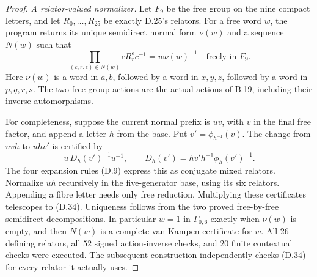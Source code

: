 \begin{proof}
\emph{A relator-valued normalizer.}
Let $F_9$ be the free group on the nine compact letters,
and let $R_0,\ldots,R_{25}$ be exactly D.25's relators.
For a free word $w$, the program
 returns its unique semidirect
normal form $\nu(w)$ and a sequence $N(w)$ such that
\[
     \prod_{(c,r,\epsilon)\in N(w)}cR_r^\epsilon c^{-1}
                            =w\nu(w)^{-1}
                   \quad\text{freely in }F_9.             \tag{D.34}
\]
Here $\nu(w)$ is a word in $a,b$, followed by a word in
$x,y,z$, followed by a word in $p,q,r,s$.
The two free-group actions are the actual actions of
B.19, including their inverse automorphisms.

For completeness, suppose the current normal prefix
is $uv$, with $v$ in the final free factor, and append
a letter $h$ from the base.  Put $v'=\phi_{h^{-1}}(v)$.
The change from $uvh$ to $uhv'$ is certified by
\[
       u\,D_h(v')^{-1}u^{-1},\qquad
       D_h(v')=hv'h^{-1}\phi_h(v')^{-1}.
\]
The four expansion rules (D.9) express this as conjugate
mixed relators.  Normalize $uh$ recursively in the
five-generator base, using its six relators.  Appending
a fibre letter needs only free reduction.  Multiplying
these certificates telescopes to (D.34).
Uniqueness follows from the two proved free-by-free
semidirect decompositions.  In particular $w=1$ in
$\Gamma_{0,6}$ exactly when $\nu(w)$ is empty, and then
$N(w)$ is a complete van Kampen certificate for $w$.
All $26$ defining relators, all $52$ signed action-inverse
checks, and $20$ finite contextual checks were executed.
The subsequent construction independently checks (D.34)
for every relator it actually uses.


\end{proof}
